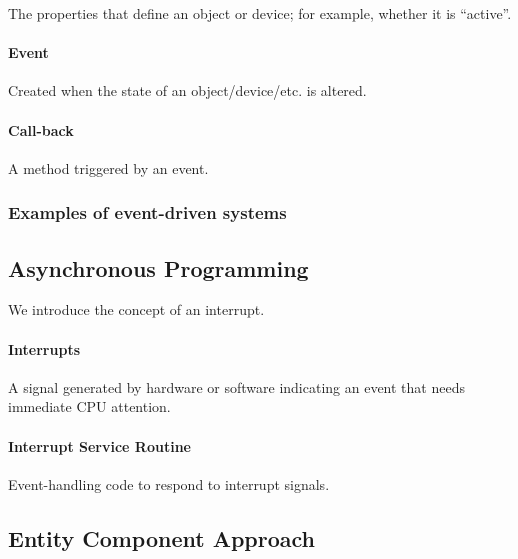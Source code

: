 \documentclass[]{article}
\let\oldparagraph\paragraph
\renewcommand{\paragraph}[1]{\oldparagraph{#1}\mbox{}}
\begin{document}
The properties that define an object or device; for example, whether it
is ``active''.

\hypertarget{event}{%
\paragraph{Event}\label{event}}

Created when the state of an object/device/etc. is altered.

\hypertarget{call-back}{%
\paragraph{Call-back}\label{call-back}}

A method triggered by an event.

\hypertarget{examples-of-event-driven-systems}{%
\subsubsection{Examples of event-driven
systems}\label{examples-of-event-driven-systems}}

\hypertarget{asynchronous-programming}{%
\subsection{Asynchronous Programming}\label{asynchronous-programming}}

We introduce the concept of an interrupt.

\hypertarget{interrupts}{%
\paragraph{Interrupts}\label{interrupts}}

A signal generated by hardware or software indicating an event that
needs immediate CPU attention.

\hypertarget{interrupt-service-routine}{%
\paragraph{Interrupt Service Routine}\label{interrupt-service-routine}}

Event-handling code to respond to interrupt signals.

\hypertarget{entity-component-approach}{%
\subsection{Entity Component Approach}\label{entity-component-approach}}
\end{document}

